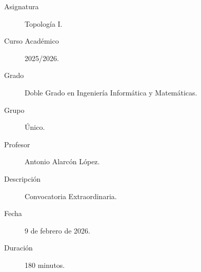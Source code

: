 \documentclass[12pt]{article}
\begin{document}

    
    

    \begin{description}
        \item[Asignatura] Topología I.
        \item[Curso Académico] 2025/2026.
        \item[Grado] Doble Grado en Ingeniería Informática y Matemáticas.
        \item[Grupo] Único.
        \item[Profesor] Antonio Alarcón López.
        \item[Descripción] Convocatoria Extraordinaria.
        \item[Fecha] 9 de febrero de 2026.
        \item[Duración] 180 minutos.
    
    \end{description}
    \newpage


    
\end{document}
